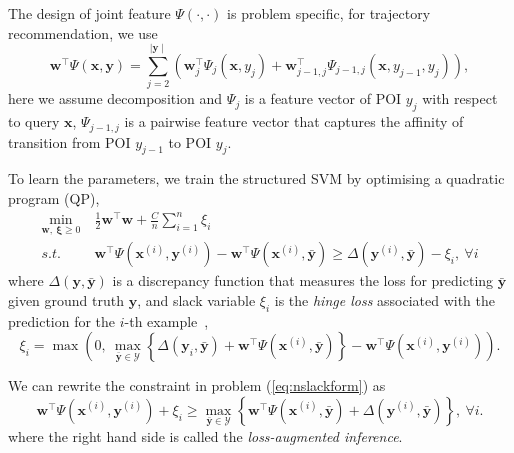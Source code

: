 \documentclass[9pt]{extarticle}
\begin{document}
The design of joint feature $\Psi(\cdot,\cdot)$ is problem specific, 
for trajectory recommendation, we use
\begin{equation*}
\label{eq:jointfeature}
\mathbf{w}^\top \Psi(\mathbf{x}, \mathbf{y}) 
= \sum_{j=2}^{\mid \mathbf{y} \mid} 
  \left( \mathbf{w}_j^\top \Psi_j(\mathbf{x}, y_j) + 
  \mathbf{w}_{j-1,j}^\top \Psi_{j-1, j}(\mathbf{x}, y_{j-1}, y_j) \right),
\end{equation*}
here we assume decomposition and $\Psi_j$ is a feature vector of POI $y_j$ with respect to query $\mathbf{x}$,
$\Psi_{j-1,j}$ is a pairwise feature vector that captures the affinity of transition from POI $y_{j-1}$ to POI $y_j$.

To learn the parameters, we train the structured SVM by optimising a quadratic program (QP),
\begin{equation}
\label{eq:nslackform}
\begin{aligned}
\min_{\mathbf{w}, ~\bm{\xi} \ge 0} ~& \frac{1}{2} \mathbf{w}^\top \mathbf{w} + \frac{C}{n} \sum_{i=1}^n \xi_i \\
s.t.~~ ~& \mathbf{w}^\top \Psi(\mathbf{x}^{(i)}, \mathbf{y}^{(i)}) - \mathbf{w}^\top \Psi(\mathbf{x}^{(i)}, \bar{\mathbf{y}}) \ge 
       \Delta(\mathbf{y}^{(i)}, \bar{\mathbf{y}}) - \xi_i, ~\forall i
\end{aligned}
\end{equation}
where $\Delta(\mathbf{y}, \bar{\mathbf{y}})$ is a discrepancy function that measures the loss 
for predicting $\bar{\mathbf{y}}$ given ground truth $\mathbf{y}$, 
and slack variable $\xi_i$ is the \emph{hinge loss} associated with the prediction for the $i$-th example~\cite{tsochantaridis2005large},
\begin{equation*}
\xi_i = \max \left( 0,~ 
        \max_{\bar{\mathbf{y}} \in \mathcal{Y}} 
        \left\{ \Delta(\mathbf{y}_i, \bar{\mathbf{y}}) + \mathbf{w}^\top \Psi(\mathbf{x}^{(i)}, \bar{\mathbf{y}}) \right\} -
        \mathbf{w}^\top \Psi(\mathbf{x}^{(i)}, \mathbf{y}^{(i)}) \right).
\end{equation*}

We can rewrite the constraint in problem (\ref{eq:nslackform}) as
\begin{equation}
\label{eq:ssvminf}
\mathbf{w}^\top \Psi(\mathbf{x}^{(i)}, \mathbf{y}^{(i)}) + \xi_i \ge
          \max_{\bar{\mathbf{y}} \in \mathcal{Y}} 
          \left\{\mathbf{w}^\top \Psi(\mathbf{x}^{(i)}, \bar{\mathbf{y}}) + \Delta(\mathbf{y}^{(i)}, \bar{\mathbf{y}}) \right\},~ \forall i.
\end{equation}
where the right hand side is called the \emph{loss-augmented inference}.
\end{document}
